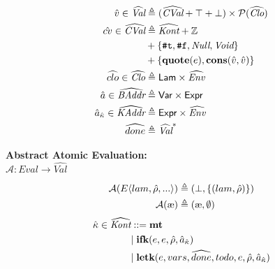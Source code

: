\documentclass[12pt,draft]{article}
\newcommand\mae{\ensuremath{\text{\ae}}}
\newcommand{\truesyn}{\texttt{\#t}}
\newcommand{\falsesyn}{\texttt{\#f}}
\begin{document}
\begin{multicols*}{2}
\begin{align*}
    \aval \in \widehat{\textit{Val}} &\triangleq
                                       (\widehat{\textit{CVal}} + \top + \bot)
                                       \times \mathcal{P}(\widehat{\textit{Clo}}) \\
    \hat{cv} \in \widehat{\textit{CVal}}
    &\triangleq \widehat{\textit{Kont}} + \mathbb{Z} \\
    &+ \{\truesyn , \falsesyn , \textit{Null} , \textit{Void}\} \\
    &+ \{\textbf{quote}(e) , \textbf{cons}(\aval, \aval)\} \\
    \aclo \in \widehat{\textit{Clo}}
    &\triangleq \textsf{Lam} \times \widehat{\textit{Env}} \\
    \abaddr \in \widehat{\textit{BAddr}}
    &\triangleq
      \textsf{Var} \times \textsf{Expr} \\
    \akaddr \in \widehat{\textit{KAddr}}
    &\triangleq
      \textsf{Expr} \times \widehat{\textit{Env}} \\
    \adone &\triangleq \widehat{\textit{Val}}^*
                     \end{align*}
  \begin{center}
    \textbf{Abstract Atomic Evaluation:} \\
    $\mathcal{A} : \textit{Eval} \rightarrow \widehat{\textit{Val}}$
  \end{center}
  \vspace{-7mm}
  \begin{align*}
    \mathcal{A}(E\langle lam , \aenv , ... \rangle)
    &\triangleq (\bot , \{(lam , \aenv)\}) \\
    \mathcal{A}(\mae)
    &\triangleq (\mae , \emptyset) \\
  \end{align*}
  \vfill\null
  \columnbreak
  \begin{align*}
    \hat{\kappa} \in \widehat{\textit{Kont}}
    &::= \textbf{mt} \\
    &|\; \textbf{ifk}(e, e, \aenv, \akaddr) \\
    &|\; \textbf{letk}(e, vars, \adone, todo, e , \aenv, \akaddr) \\

\end{align*}
\end{multicols*}
\end{document}
